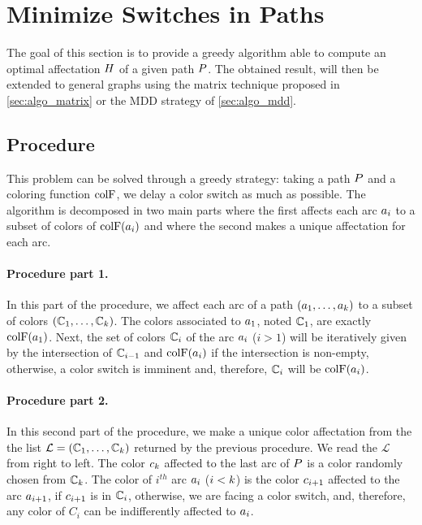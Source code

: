 \section{Minimize Switches in Paths}

The goal of this section is to provide a greedy algorithm able to compute an optimal affectation $H$ of a given path $P$. The obtained result, will then be extended to general graphs using the matrix technique proposed in \cref{sec:algo_matrix} or the MDD strategy of \cref{sec:algo_mdd}.

\subsection{Procedure}
\label{sec:path_proc}
This problem can be solved through a greedy strategy: taking a path $P$ and a coloring function $\text{colF}$, we delay a color switch as much as possible. The algorithm is decomposed in two main parts where the first affects each arc $a_i$ to a subset of colors of $\text{colF}(a_i)$ and where the second makes a unique affectation for each arc.

\paragraph{Procedure part 1.}
In this part of the procedure, we affect each arc of a path $(a_1,\ldots,a_{k})$ to a subset of colors $(\mathbb{C}_1,\ldots,\mathbb{C}_{k})$. The colors associated to $a_1$, noted $\mathbb{C}_1$, are exactly $\text{colF}(a_1)$. Next, the set of colors $\mathbb{C}_i$ of the arc $a_i$ ($i > 1$) will be iteratively given by the intersection of $\mathbb{C}_{i-1}$ and $\text{colF}(a_i)$ if the intersection is non-empty, otherwise, a color switch is imminent and, therefore, $\mathbb{C}_i$ will be $\text{colF}(a_i)$.

\paragraph{Procedure part 2.}
In this second part of the procedure, we make a unique color affectation from the the list $\mathcal{L} = (\mathbb{C}_1,\ldots,\mathbb{C}_{k})$ returned by the previous procedure. We read the $\mathcal{L}$ from right to left. The color $c_k$ affected to the last arc of $P$ is a color randomly chosen from $\mathbb{C}_k$. The color of $i^{th}$ arc $a_{i}$ ($i < k$) is the color $c_{i+1}$ affected to the arc $a_{i+1}$, if $c_{i+1}$ is in $\mathbb{C}_i$, otherwise, we are facing a color switch, and, therefore, any color of $C_i$ can be indifferently affected to $a_i$.


